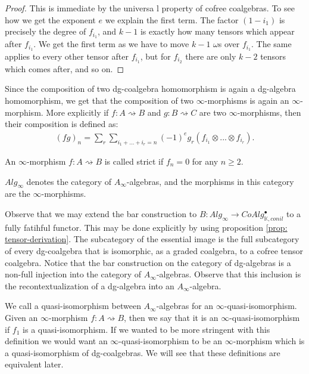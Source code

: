 \documentclass[../thesis.tex]{subfiles}
\begin{document}
        \begin{proof}
            This is immediate by the universa l property of cofree coalgebras. To see how we get the exponent $e$ we explain the first term. The factor $(1 - i_1)$ is precisely the degree of $f_{i_1}$, and $k-1$ is exactly how many tensors which appear after $f_{i_1}$. We get the first term as we have to move $k-1$ $\omega$s over $f_{i_1}$. The same applies to every other tensor after $f_{i_1}$, but for $f_{i_2}$ there are only $k-2$ tensors which comes after, and so on.
        \end{proof}

        Since the composition of two dg-coalgebra homomorphism is again a dg-algebra homomorphism, we get that the composition of two $\infty$-morphisms is again an $\infty$-morphism. More explicitly if $f:A\rightsquigarrow B$ and $g: B\rightsquigarrow C$ are two $\infty$-morphisms, then their composition is defined as:
        \begin{align*}
            (fg)_n = \sum_r\sum_{i_1 + ... + i_r = n} (-1)^eg_r(f_{i_1}\otimes ... \otimes f_{i_r})\text{.}
        \end{align*}

        \begin{definition}
            An $\infty$-morphism $f: A\rightsquigarrow B$ is called strict if $f_n = 0$ for any $n\geq 2$. 
        \end{definition}

        \begin{definition}
            $Alg_\infty$ denotes the category of $A_\infty$-algebras, and the morphisms in this category are the $\infty$-morphisms.
        \end{definition}

        Observe that we may extend the bar construction to $B : Alg_\infty \rightarrow CoAlg_{\mathbb{K},conil}^\bullet$ to a fully fatihful functor. This may be done explicitly by using proposition \ref{prop: tensor-derivation}. The subcategory of the essential image is the full subcategory of every dg-coalgebra that is isomorphic, as a graded coalgebra, to a cofree tensor coalgebra. Notice that the bar construction on the category of dg-algebras is a non-full injection into the category of $A_\infty$-algebras. Observe that this inclusion is the recontextualization of a dg-algebra into an $A_\infty$-algebra.

        We call a quasi-isomorphism between $A_\infty$-algebras for an $\infty$-quasi-isomorphism. Given an $\infty$-morphism $f: A\rightsquigarrow B$, then we say that it is an $\infty$-quasi-isomorphism if $f_1$ is a quasi-isomorphism. If we wanted to be more stringent with this definition we would want an $\infty$-quasi-isomorphism to be an $\infty$-morphism which is a quasi-isomorphism of dg-coalgebras. We will see that these definitions are equivalent later.
\end{document}

